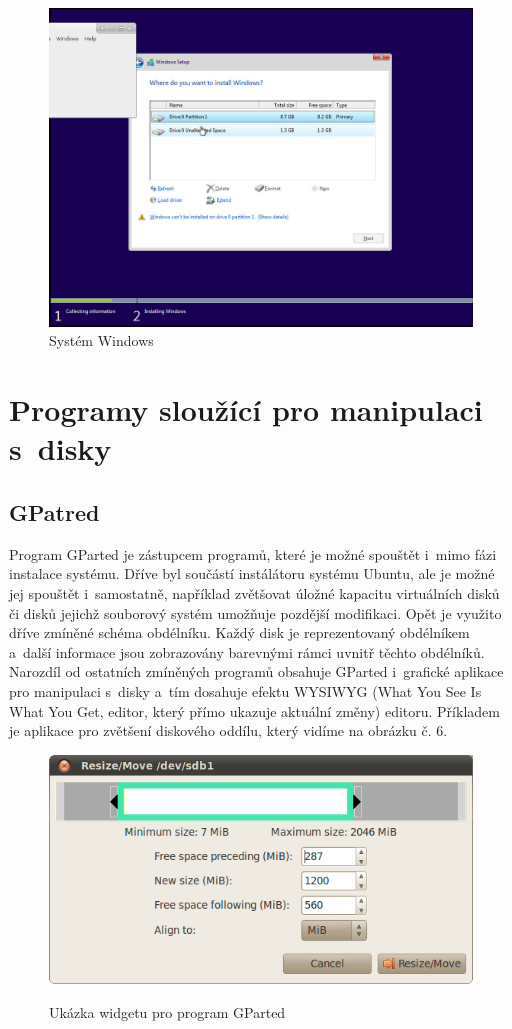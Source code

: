 \documentclass[a4paper,twosided]{article}
\begin{document}
\begin{figure}[h]
\label{fig:win}
\caption{Systém Windows}
\centering
\includegraphics[width=.8\columnwidth]{pics/win1.jpg}
\end{figure}

\section{Programy sloužící pro manipulaci s~disky}

\subsection{GPatred}

Program GParted je zástupcem programů, které je možné spouštět i~mimo fázi instalace systému. Dříve byl součástí instálátoru systému Ubuntu, ale je možné jej spouštět i~samostatně, například 
 zvětšovat úložné kapacitu virtuálních disků či disků jejichž souborový systém umožňuje pozdější modifikaci. Opět je využito dříve zmíněné schéma obdélníku. Každý disk je reprezentovaný 
obdélníkem a~další informace jsou zobrazovány barevnými rámci uvnitř těchto obdélníků. Narozdíl od ostatních zmíněných programů obsahuje GParted i~grafické aplikace pro manipulaci s~disky 
a~tím dosahuje efektu WYSIWYG (What You See Is What You Get, editor, který přímo ukazuje aktuální změny) editoru. Příkladem je aplikace pro zvětšení diskového oddílu, který vidíme na obrázku č. 6.

\begin{figure}[hb]
\label{fig:gparted}
\caption{Ukázka widgetu pro program GParted~\cite{GParted}}
\centering
\includegraphics[width=.8\columnwidth]{pics/gparted-5-big.png}\\
\end{figure}
\end{document}
